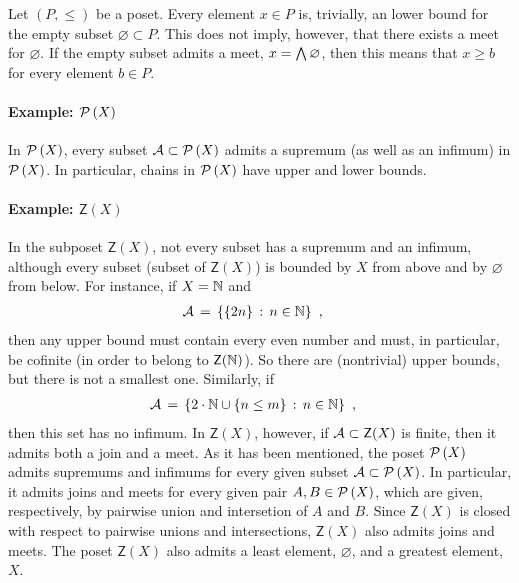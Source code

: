\begin{remarkMeetEmptySet}
	Let $(P,\leq)$ be a poset. Every element $x\in P$ is, trivially,
	an lower bound for the empty subset $\varnothing\subset P$. This
	does not imply, however, that there exists a meet for $\varnothing$.
	If the empty subset admits a meet, $x=\bigboolprod\varnothing$, then
	this means that $x\geq b$ for every element $b\in P$.
\end{remarkMeetEmptySet}

\paragraph{Example: $\powset{X}$}
In $\powset{X}$, every subset $\cal{A}\subset\powset{X}$ admits a supremum
(as well as an infimum) in $\powset{X}$. In particular, chains in
$\powset{X}$ have upper and lower bounds.

\paragraph{Example: $\mathsf{Z}(X)$}
In the subposet $\mathsf{Z}(X)$, not every subset has a supremum
and an infimum, although every subset (subset of $\mathsf{Z}(X)$) is
bounded by $X$ from above and by $\varnothing$ from below. For instance,
if $X=\bb{N}$ and
\begin{align*}
	\cal{A} & \,=\, \left\lbrace \{2n\} \,:\, n\in \bb{N}\right\rbrace
	\text{ ,}
\end{align*}
%
then any upper bound must contain every even number and must, in particular,
be cofinite (in order to belong to $\mathsf{Z}(\bb{N})$). So there are
(nontrivial) upper bounds, but there is not a smallest one. Similarly, if
\begin{align*}
	\cal{A} & \,=\, \left\lbrace 2\cdot\bb{N} \cup \{n\leq m\} \,:\,
		n\in\bb{N} \right\rbrace
	\text{ ,}
\end{align*}
%
then this set has no infimum. In $\mathsf{Z}(X)$, however, if
$\cal{A}\subset\mathsf{Z}(X)$ is finite, then it admits both a join and a
meet. As it has been mentioned, the poset $\powset{X}$ admits supremums and
infimums for every given subset $\cal{A}\subset\powset{X}$. In particular,
it admits joins and meets for every given pair $A,B\in\powset{X}$, which are
given, respectively, by pairwise union and intersetion of $A$ and $B$. Since
$\mathsf{Z}(X)$ is closed with respect to pairwise unions and intersections,
$\mathsf{Z}(X)$ also admits joins and meets. The poset $\mathsf{Z}(X)$
also admits a least element, $\varnothing$, and a greatest element, $X$.

